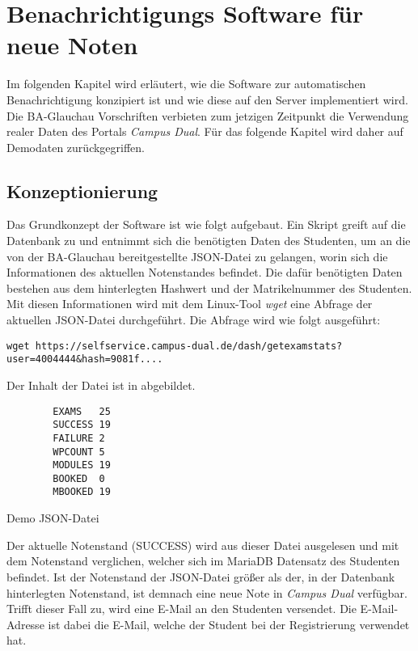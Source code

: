 \chapter{Benachrichtigungs Software für neue Noten}
Im folgenden Kapitel wird erläutert, wie die Software zur automatischen Benachrichtigung konzipiert ist und wie diese auf den Server implementiert wird.
Die BA-Glauchau Vorschriften verbieten zum jetzigen Zeitpunkt die Verwendung realer Daten des Portals \textit{Campus Dual}.
Für das folgende Kapitel wird daher auf Demodaten zurückgegriffen.

\section{Konzeptionierung}
Das Grundkonzept der Software ist wie folgt aufgebaut.
Ein Skript greift auf die Datenbank zu und entnimmt sich die benötigten Daten des Studenten, um an die von der BA-Glauchau bereitgestellte JSON-Datei zu gelangen, worin sich die Informationen des aktuellen Notenstandes befindet.
Die dafür benötigten Daten bestehen aus dem hinterlegten Hashwert und der Matrikelnummer des Studenten.
Mit diesen Informationen wird mit dem Linux-Tool \textit{wget} eine Abfrage der aktuellen JSON-Datei durchgeführt.
Die Abfrage wird wie folgt ausgeführt:

\texttt{wget https://selfservice.campus-dual.de/dash/getexamstats?user=4004444&hash=9081f....}

Der Inhalt der Datei ist in  abgebildet.

\begin{code}
    \begin{verbatim}
        EXAMS	25
        SUCCESS	19
        FAILURE	2
        WPCOUNT	5
        MODULES	19
        BOOKED	0
        MBOOKED	19
    \end{verbatim}
    \caption[Demo JSON-Datei]{Demo JSON-Datei}
    \label{Demo JSON-Datei}
\end{code}

Der aktuelle Notenstand (SUCCESS) wird aus dieser Datei ausgelesen und mit dem Notenstand verglichen, welcher sich im MariaDB Datensatz des Studenten befindet.
Ist der Notenstand der JSON-Datei größer als der, in der Datenbank hinterlegten Notenstand, ist demnach eine neue Note in \textit{Campus Dual} verfügbar.
Trifft dieser Fall zu, wird eine E-Mail an den Studenten versendet.
Die E-Mail-Adresse ist dabei die E-Mail, welche der Student bei der Registrierung verwendet hat.

